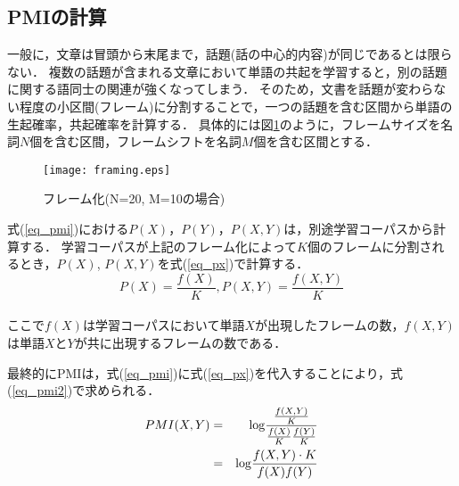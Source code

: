 \subsection{PMIの計算}
一般に，文章は冒頭から末尾まで，話題(話の中心的内容)が同じであるとは限らない．
複数の話題が含まれる文章において単語の共起を学習すると，別の話題に関する語同士の関連が強くなってしまう．
そのため，文書を話題が変わらない程度の小区間(フレーム)に分割することで，一つの話題を含む区間から単語の生起確率，共起確率を計算する．
具体的には図\ref{fig_pmi}のように，フレームサイズを名詞$N$個を含む区間，フレームシフトを名詞$M$個を含む区間とする．\\

\begin{figure}[htbp]
    \begin{center}
        \texttt{[image: framing.eps]}
        \caption{フレーム化(N=20, M=10の場合)}
        \label{fig_pmi}
    \end{center}
\end{figure}

式(\ref{eq_pmi})における$P(X)$，$P(Y)$，$P(X, Y)$は，別途学習コーパスから計算する．
学習コーパスが上記のフレーム化によって$K$個のフレームに分割されるとき，$P(X)$, $P(X, Y)$を式(\ref{eq_px})で計算する．\\

\begin{equation}
    P(X) = \frac{f(X)}{K}, P(X, Y) = \frac{f(X, Y)}{K}  \label{eq_px}
\end{equation}
\\
ここで$f(X)$は学習コーパスにおいて単語$X$が出現したフレームの数，$f(X, Y)$は単語$X$と$Y$が共に出現するフレームの数である．

最終的にPMIは，式(\ref{eq_pmi})に式(\ref{eq_px})を代入することにより，式(\ref{eq_pmi2})で求められる．
\begin{eqnarray}
    PMI(X, Y) & = & {\rm log} \frac{\frac{f(X, Y)}{K}}{\frac{f(X)}{K}\frac{f(Y)}{K}}    \nonumber   \\
    & = & {\rm log} \frac{f(X, Y) \cdot K}{f(X)f(Y)}    \label{eq_pmi2}
\end{eqnarray}

